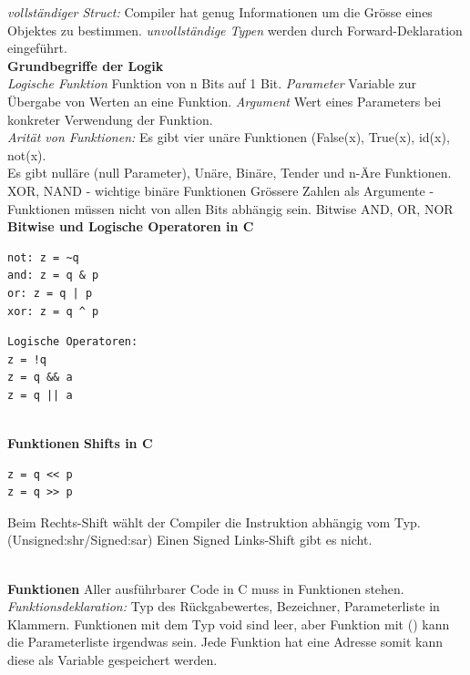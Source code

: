\documentclass[7pt,landscape,a4paper]{scrartcl}
\begin{document}
\begin{multicols*}{4}
\textit{vollständiger Struct:} Compiler hat genug Informationen um die Grösse eines Objektes zu bestimmen. \textit{unvollständige Typen} werden durch Forward-Deklaration eingeführt.\\
\textbf{Grundbegriffe der Logik}\\
\textit{Logische Funktion} Funktion von n Bits auf 1 Bit. \textit{Parameter} Variable zur Übergabe von Werten an eine Funktion. \textit{Argument} Wert eines Parameters bei konkreter Verwendung der Funktion.\\
\textit{Arität von Funktionen:} Es gibt vier unäre Funktionen (False(x), True(x), id(x), not(x).\\
Es gibt nulläre (null Parameter), Unäre, Binäre, Tender und n-Äre  Funktionen.
XOR, NAND - wichtige binäre Funktionen
Grössere Zahlen als Argumente - Funktionen müssen nicht von allen Bits abhängig sein.
Bitwise AND, OR, NOR\\
\textbf{Bitwise und Logische Operatoren in C}\\
\begin{minipage}[b]{0,4\linewidth}
\begin{verbatim}
not: z = ~q
and: z = q & p
or: z = q | p
xor: z = q ^ p
\end{verbatim}
\end{minipage}
\begin{minipage}[b]{0,4\linewidth}
\begin{verbatim}
Logische Operatoren:
z = !q
z = q && a
z = q || a
\end{verbatim}
\end{minipage}\\
\textbf{Funktionen}
\textbf{Shifts in C}\\
\begin{minipage}[b]{0,2\linewidth}
\begin{verbatim}
z = q << p
z = q >> p
\end{verbatim}
\end{minipage}
\begin{minipage}[b]{0,8\linewidth}
Beim Rechts-Shift wählt der Compiler die Instruktion abhängig vom Typ. (Unsigned:shr/Signed:sar) Einen Signed Links-Shift gibt es nicht.
\end{minipage}\\
\textbf{Funktionen}
Aller ausführbarer Code in C muss in Funktionen stehen. \textit{Funktionsdeklaration:} Typ des Rückgabewertes, Bezeichner, Parameterliste in Klammern. Funktionen mit dem Typ void sind leer, aber Funktion mit () kann die Parameterliste irgendwas sein. Jede Funktion hat eine Adresse somit kann diese als Variable gespeichert werden.\\

\end{multicols*}
\end{document}
